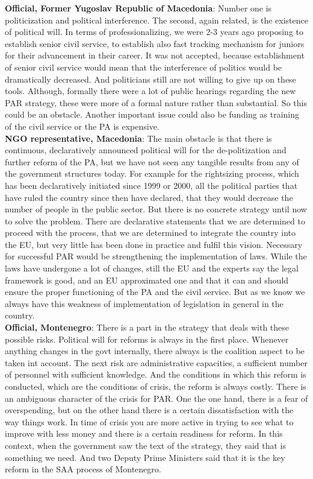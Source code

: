 \textbf{Official, Former Yugoslav Republic of Macedonia}: Number one is politicization and political interference. The second, again related, is the existence of political will. In terms of professionalizing, we were 2-3 years ago proposing to establish senior civil service, to establish also fast tracking mechanism for juniors for their advancement in their career. It was not accepted, because establishment of senior civil service would mean that the interference of politics would be dramatically decreased. And politicians still are not willing to give up on these tools. Although, formally there were a lot of public hearings regarding the new PAR strategy, these were more of a formal nature rather than substantial. So this could be an obstacle. Another important issue could also be funding as training of the civil service or the PA is expensive. \\
\textbf{NGO representative,  Macedonia}: The main obstacle is that there is continuous, declaratively announced political will for the de-politization and further reform of the PA, but we have not seen any tangible results from any of the government structures today. For example for the rightsizing process, which has been declaratively initiated since 1999 or 2000, all the political parties that have ruled the country since then have declared, that they would decrease the number of people in the public sector. But there is no concrete strategy until now to solve the problem. There are declarative statements that we are determined to proceed with the process, that we are determined to integrate the country into the EU, but very little has been done in practice and fulfil this vision. Necessary for successful PAR would be strengthening the implementation of laws. While the laws have undergone a lot of changes, still the EU and the experts say the legal framework is good, and an EU approximated one and that it can and should ensure the proper functioning of the PA and the civil service. But as we know we always have this weakness of implementation of legislation in general in the country. \\
\textbf{Official, Montenegro}: There is a part in the strategy that deals with these possible risks. Political will for reforms is always in the first place. Whenever anything changes in the govt internally, there always is the coalition aspect to be taken int account. The next risk are administrative capacities, a sufficient number of personnel with sufficient knowledge. And the conditions in which this reform is conducted, which are the conditions of crisis, the reform is always costly. There is an ambiguous character of the crisis for PAR. One the one hand, there is a fear of overspending, but on the other hand there is a certain dissatisfaction with the way things work. In time of crisis you are more active in trying to see what to improve with less money and there is a certain readiness for reform. In this context, when the government saw the text of the strategy, they said that is something we need. And two Deputy Prime Ministers said that it is the key reform in the SAA process of Montenegro. \\
